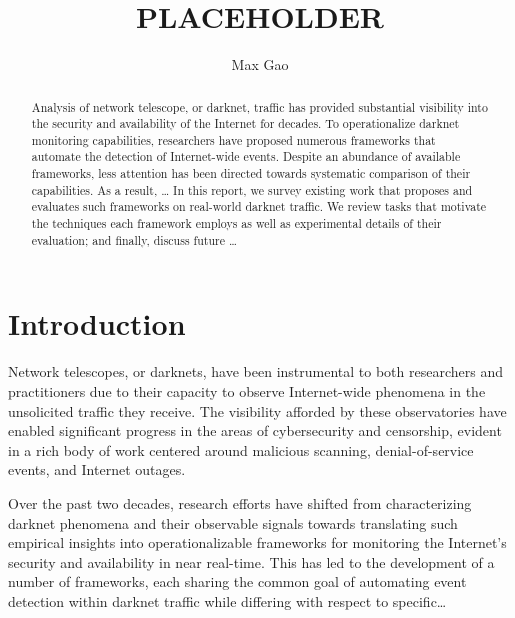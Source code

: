 \documentclass[manuscript,nonacm]{acmart}
\begin{document}
\title{PLACEHOLDER}
\author{Max Gao}

\begin{abstract}
Analysis of network telescope, or darknet, traffic has provided substantial visibility into the security and availability of the Internet for decades.
To operationalize darknet monitoring capabilities, researchers have proposed numerous frameworks that automate the detection of Internet-wide events.
Despite an abundance of available frameworks, less attention has been directed towards systematic comparison of their capabilities. 
As a result, \dots
In this report, we survey existing work that proposes and evaluates such frameworks on real-world darknet traffic.
We review tasks that motivate the techniques each framework employs as well as experimental details of their evaluation; and finally, discuss future \dots
\end{abstract}

\maketitle

\section{Introduction}

Network telescopes, or darknets, have been instrumental to both researchers and practitioners due to their capacity to observe Internet-wide phenomena in the unsolicited traffic they receive. 
The visibility afforded by these observatories have enabled significant progress in the areas of cybersecurity and censorship, evident in a rich body of work centered around 
malicious scanning, denial-of-service events, and Internet outages. 

Over the past two decades, research efforts have shifted from characterizing darknet phenomena and their observable signals towards translating such empirical insights into operationalizable frameworks for monitoring the Internet's security and availability in near real-time.  
This has led to the development of a number of frameworks, each sharing the common goal of automating event detection within darknet traffic while 
differing with respect to specific\dots
\end{document}
